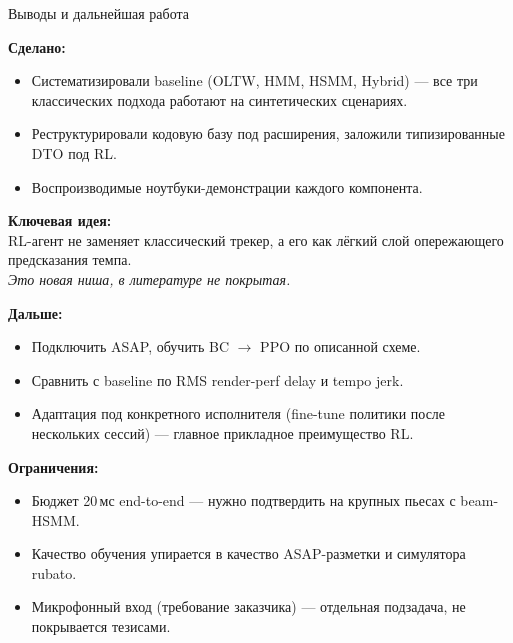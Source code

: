 ﻿%
\begin{frame}{Выводы и дальнейшая работа}
  \small

  \textbf{Сделано:}
  \begin{itemize}\footnotesize\setlength{\itemsep}{0.2em}
    \item Систематизировали baseline (OLTW, HMM, HSMM, Hybrid) ---
          все три классических подхода работают на синтетических
          сценариях.
    \item Реструктурировали кодовую базу под расширения, заложили
          типизированные DTO под RL.
    \item Воспроизводимые ноутбуки-демонстрации каждого компонента.
  \end{itemize}

  \textbf{Ключевая идея:}\\
  RL-агент не заменяет классический трекер, а  его
  как лёгкий слой опережающего предсказания темпа. \\
  \emph{Это новая ниша, в литературе не покрытая.}

  \textbf{Дальше:}
  \begin{itemize}\footnotesize\setlength{\itemsep}{0.2em}
    \item Подключить ASAP, обучить BC $\to$ PPO по описанной схеме.
    \item Сравнить с baseline по RMS render-perf delay и tempo jerk.
    \item Адаптация под конкретного исполнителя (fine-tune политики
          после нескольких сессий) --- главное прикладное
          преимущество RL.
  \end{itemize}

  \textbf{Ограничения:}
  \begin{itemize}\footnotesize\setlength{\itemsep}{0.2em}
    \item Бюджет 20\,мс end-to-end --- нужно подтвердить на крупных
          пьесах с beam-HSMM.
    \item Качество обучения упирается в качество ASAP-разметки и
          симулятора rubato.
    \item Микрофонный вход (требование заказчика) --- отдельная
          подзадача, не покрывается тезисами.
  \end{itemize}
\end{frame}
